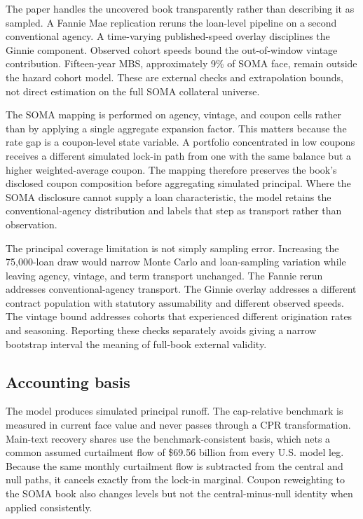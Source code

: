 The paper handles the uncovered book transparently rather than describing it as sampled. A Fannie Mae replication reruns the loan-level pipeline on a second conventional agency. A time-varying published-speed overlay disciplines the Ginnie component. Observed cohort speeds bound the out-of-window vintage contribution. Fifteen-year MBS, approximately 9\% of SOMA face, remain outside the hazard cohort model. These are external checks and extrapolation bounds, not direct estimation on the full SOMA collateral universe.

The SOMA mapping is performed on agency, vintage, and coupon cells rather than by applying a single aggregate expansion factor. This matters because the rate gap is a coupon-level state variable. A portfolio concentrated in low coupons receives a different simulated lock-in path from one with the same balance but a higher weighted-average coupon. The mapping therefore preserves the book's disclosed coupon composition before aggregating simulated principal. Where the SOMA disclosure cannot supply a loan characteristic, the model retains the conventional-agency distribution and labels that step as transport rather than observation.

The principal coverage limitation is not simply sampling error. Increasing the 75,000-loan draw would narrow Monte Carlo and loan-sampling variation while leaving agency, vintage, and term transport unchanged. The Fannie rerun addresses conventional-agency transport. The Ginnie overlay addresses a different contract population with statutory assumability and different observed speeds. The vintage bound addresses cohorts that experienced different origination rates and seasoning. Reporting these checks separately avoids giving a narrow bootstrap interval the meaning of full-book external validity.

\subsection{Accounting basis}

The model produces simulated principal runoff. The cap-relative benchmark is measured in current face value and never passes through a CPR transformation. Main-text recovery shares use the benchmark-consistent basis, which nets a common assumed curtailment flow of \$69.56 billion from every U.S. model leg. Because the same monthly curtailment flow is subtracted from the central and null paths, it cancels exactly from the lock-in marginal. Coupon reweighting to the SOMA book also changes levels but not the central-minus-null identity when applied consistently.

